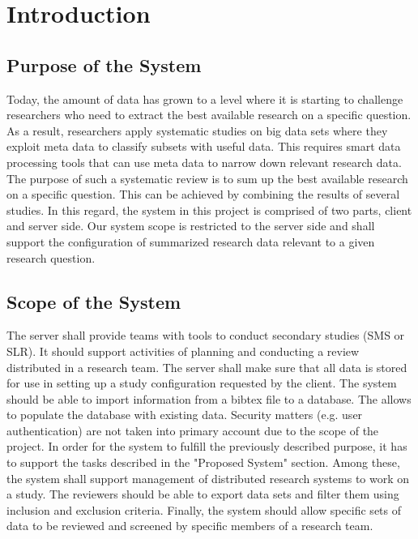 
\section{Introduction}

\subsection{Purpose of the System}
Today, the amount of data has grown to a level where it is starting to challenge researchers who need to extract the best available research on a specific question. As a result, researchers apply systematic studies on big data sets where they exploit meta data to classify subsets with useful data. This requires smart data processing tools that can use meta data to narrow down relevant research data. The purpose of such a systematic review is to sum up the best available research on a specific question. This can be achieved by combining the results of several studies. In this regard, the system in this project is comprised of two parts, client and server side. Our system scope is restricted to the server side and shall support the configuration of summarized research data relevant to a given research question. 

\subsection{Scope of the System}
The server shall provide teams with tools to conduct secondary studies (SMS or SLR). It should support activities of planning and conducting a review distributed in a research team. The server shall make sure that all data is stored for use in setting up a study configuration requested by the client. The system should be able to import information from a bibtex file to a database. The allows to populate the database with existing data. Security matters (e.g. user authentication) are not taken into primary account due to the scope of the project. 
In order for the system to fulfill the previously described purpose, it has to support the tasks described in the "Proposed System" section. Among these, the system shall support management of distributed research systems to work on a study. The reviewers should be able to export data sets and filter them using inclusion and exclusion criteria. Finally, the system should allow specific sets of data to be reviewed and screened by specific members of a research team. 

